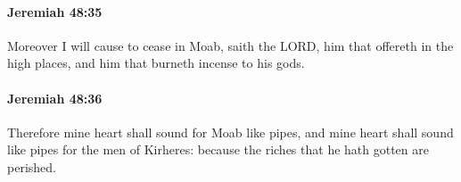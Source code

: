 		\paragraph{Jeremiah 48:35} %
			\label{JEREMIAH-48-35}

			Moreover I will cause to cease in Moab, saith the LORD, him that offereth in the high places, and him that burneth incense to his gods.


		\paragraph{Jeremiah 48:36} %
			\label{JEREMIAH-48-36}

			Therefore mine heart shall sound for Moab like pipes, and mine heart shall sound like pipes for the men of Kirheres: because the riches that he hath gotten are perished.


